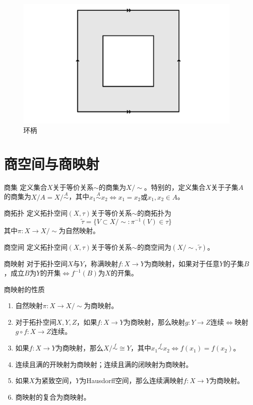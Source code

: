 \documentclass[lang = cn, scheme = chinese, thmcnt = section, usesamecnt]{elegantbook}
\newcommand{\sub}{\subset}             %
\begin{document}
\begin{figure}[H]
	\centering
	\caption{环柄}
	\includegraphics[scale = 0.15]{figure/环柄}
\end{figure}

\section{商空间与商映射}

\begin{definition}{商集}
	定义集合$X$关于等价关系$\sim$的商集为$X/\sim$。特别的，定义集合$X$关于子集$A$的商集为$X/ A=X/\overset{A}{\sim}$，其中$x_1\overset{A}{\sim} x_2\iff x_1=x_2\text{或}x_1,x_2\in A$。
\end{definition}

\begin{definition}{商拓扑}
	定义拓扑空间$(X,\tau)$关于等价关系$\sim$的商拓扑为
	$$
	\tilde{\tau}=\{ V\sub X/\sim :\pi^{-1}(V)\in \tau \}
	$$
	其中$\pi:X\to X/\sim$为自然映射。
\end{definition}

\begin{definition}{商空间}
	定义拓扑空间$(X,\tau)$关于等价关系$\sim$的商空间为$(X/\sim,\tilde{\tau})$。
\end{definition}

\begin{definition}{商映射}
	对于拓扑空间$X$与$Y$，称满映射$f:X\to Y$为商映射，如果对于任意$Y$的子集$B$，成立$B$为$Y$的开集$\iff f^{-1}(B)$为$X$的开集。
\end{definition}

\begin{theorem}{商映射的性质}
	\begin{enumerate}
		\item 自然映射$\pi:X\to X/\sim$为商映射。
		\item 对于拓扑空间$X,Y,Z$，如果$f:X\to Y$为商映射，那么映射$g:Y\to Z$连续$\iff$映射$g\circ f:X\to Z$连续。
		\item 如果$f:X\to Y$为商映射，那么$X/\overset{f}{\sim}\cong Y$，其中$x_1 \overset{f}{\sim} x_2\iff f(x_1)=f(x_2)$。
		\item 连续且满的开映射为商映射；连续且满的闭映射为商映射。
		\item 如果$X$为紧致空间，$Y$为Hausdorff空间，那么连续满映射$f:X\to Y$为商映射。
		\item 商映射的复合为商映射。
	\end{enumerate}
\end{theorem}
\end{document}

